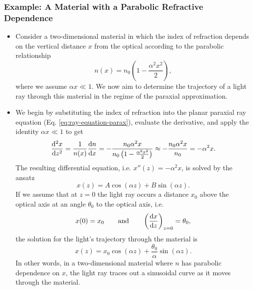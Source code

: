 \documentclass[11pt, a4paper]{article}
\begin{document}
\subsubsection{Example: A Material with a Parabolic Refractive Dependence}
\begin{itemize}
    \item Consider a two-dimensional material in which the index of refraction depends on the vertical distance $ x $ from the optical according to the parabolic relationship
    \begin{equation*}
        n(x) = n_{0} \left( 1 - \frac{\alpha^{2} x^{2}}{2} \right),
    \end{equation*}
    where we assume $ \alpha x \ll 1 $. We now aim to determine the trajectory of a light ray through this material in the regime of the paraxial approximation.

    \item We begin by substituting the index of refraction into the planar paraxial ray equation (Eq. \ref{eq:ray-equation-parax}), evaluate the derivative, and apply the identity $ \alpha x \ll 1 $ to get
    \begin{equation*}
        \dv[2]{x}{z} = \frac{1}{n(x)} \dv{n}{x} = - \frac{n_{0} \alpha^{2} x}{n_{0} \left( 1 - \frac{\alpha^{2} x^{2}}{2} \right)} \approx - \frac{n_{0} \alpha^{2} x}{n_{0}} = - \alpha^{2} x.
    \end{equation*}
    The resulting differential equation, i.e. $ x''(z) = - \alpha^{2} x $, is solved by the ansatz
    \begin{equation*}
        x(z) = A \cos (\alpha z) + B \sin (\alpha z).
    \end{equation*}
    If we assume that at $ z = 0 $ the light ray occurs a distance $ x_{0} $ above the optical axis at an angle $ \theta_{0} $ to the optical axis, i.e.
    \begin{equation*}
        x(0) = x_{0} \qquad \text{and} \qquad \left( \dv{x}{z} \right)_{z = 0} = \theta_{0},
    \end{equation*}
    the solution for the light's trajectory through the material is
    \begin{equation*}
        x(z) = x_{0} \cos (\alpha z) + \frac{\theta_{0}}{\alpha}\sin(\alpha z).
    \end{equation*}
    In other words, in a two-dimensional material where $ n $ has parabolic dependence on $ x $, the light ray traces out a sinusoidal curve as it moves through the material.
    
\end{itemize}
\end{document}
